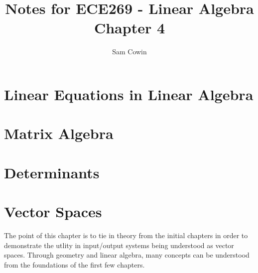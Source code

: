 \documentclass[12pt]{article}
\begin{document}
\setlength{\abovedisplayskip}{0pt}
\setlength{\belowdisplayskip}{0pt}
\setlength{\abovedisplayshortskip}{0pt}
\setlength{\belowdisplayshortskip}{0pt}

\title{Notes for ECE269 - Linear Algebra \\
\large Chapter 4}
\author{Sam Cowin}
\maketitle

\section{Linear Equations in Linear Algebra}
\section{Matrix Algebra}
\section{Determinants}
\section{Vector Spaces}
The point of this chapter is to tie in theory from the initial chapters in order to demonstrate the utlity in input/output systems being understood as vector spaces. %
Through geometry and linear algebra, many concepts can be understood from the foundations of the first few chapters. 
\end{document}
